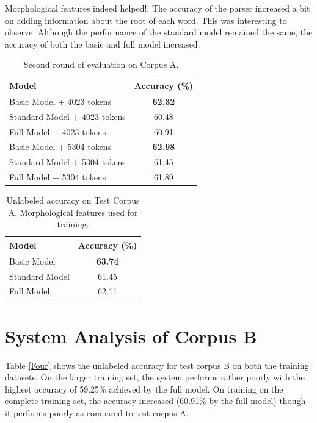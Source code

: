 \documentclass[11pt,letterpaper]{article}
\begin{document}
Morphological features indeed helped!. The accuracy of the parser increased a bit on adding information about the root of each word. This was interesting to observe. Although the performance of the standard model remained the same, the accuracy of both the basic and full model increased. 


\begin{table}
\begin{center}
  \begin{tabular}{ l || c }
  \hline
  Model & Accuracy (\%)\\
  \hline
  Basic Model + 4023 tokens & \textbf{62.32} \\
  Standard Model + 4023 tokens & 60.48 \\
  Full Model + 4023 tokens & 60.91 \\
  Basic Model + 5304 tokens & \textbf{62.98} \\
  Standard Model + 5304 tokens & 61.45 \\
  Full Model + 5304 tokens & 61.89\\
  \hline
   \end{tabular}
\end{center}
\caption{Second round of evaluation on Corpus A.}
\label{Second}
\end{table}



\begin{table}
\begin{center}
  \begin{tabular}{ l || c }
  \hline
  Model & Accuracy (\%)\\
  \hline
  Basic Model & \textbf{63.74} \\
  Standard Model & 61.45 \\
  Full Model & 62.11 \\
  \hline
   \end{tabular}
\end{center}
\caption{Unlabeled accuracy on Test Corpus A. Morphological features used for training.}
\label{Third}
\end{table}

\section{System Analysis of Corpus B}

Table \ref{Four} shows the unlabeled accuracy for test corpus B on both the training datasets. On the larger training set, the system performs rather poorly with the highest accuracy of 59.25\% achieved by the full model. On training on the complete training set, the accuracy increased (60.91\% by the full model) though it performs poorly as compared to test corpus A. 
\end{document}
